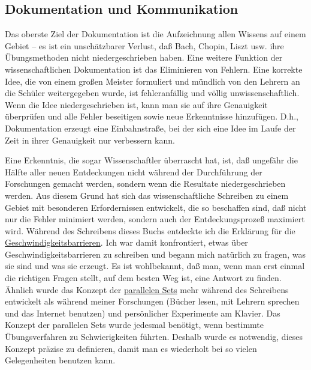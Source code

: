 \subsection{Dokumentation und Kommunikation}
\label{c3_3d}

Das oberste Ziel der Dokumentation ist die Aufzeichnung allen Wissens auf einem Gebiet -- es ist ein unschätzbarer Verlust, daß Bach, Chopin, Liszt usw. ihre Übungsmethoden nicht niedergeschrieben haben.
Eine weitere Funktion der wissenschaftlichen Dokumentation ist das Eliminieren von Fehlern.
Eine korrekte Idee, die von einem großen Meister formuliert und mündlich von den Lehrern an die Schüler weitergegeben wurde, ist fehleranfällig und völlig unwissenschaftlich.
Wenn die Idee niedergeschrieben ist, kann man sie auf ihre Genauigkeit überprüfen und alle Fehler beseitigen sowie neue Erkenntnisse hinzufügen.
D.h., Dokumentation erzeugt eine Einbahnstraße, bei der sich eine Idee im Laufe der Zeit in ihrer Genauigkeit nur verbessern kann.

Eine Erkenntnis, die sogar Wissenschaftler überrascht hat, ist, daß ungefähr die Hälfte aller neuen Entdeckungen nicht während der Durchführung der Forschungen gemacht werden, sondern wenn die Resultate niedergeschrieben werden.
Aus diesem Grund hat sich das wissenschaftliche Schreiben zu einem Gebiet mit besonderen Erfordernissen entwickelt, die so beschaffen sind, daß nicht nur die Fehler minimiert werden, sondern auch der Entdeckungsprozeß maximiert wird.
Während des Schreibens dieses Buchs entdeckte ich die Erklärung für die \hyperref[c1iv2b]{Geschwindigkeitsbarrieren}.
Ich war damit konfrontiert, etwas über Geschwindigkeitsbarrieren zu schreiben und begann mich natürlich zu fragen, was sie sind und was sie erzeugt.
Es ist wohlbekannt, daß man, wenn man erst einmal die richtigen Fragen stellt, auf dem besten Weg ist, eine Antwort zu finden.
Ähnlich wurde das Konzept der \hyperref[c1iii7b]{parallelen Sets} mehr während des Schreibens entwickelt als während meiner Forschungen (Bücher lesen, mit Lehrern sprechen und das Internet benutzen) und persönlicher Experimente am Klavier.
Das Konzept der parallelen Sets wurde jedesmal benötigt, wenn bestimmte Übungsverfahren zu Schwierigkeiten führten.
Deshalb wurde es notwendig, dieses Konzept präzise zu definieren, damit man es wiederholt bei so vielen Gelegenheiten benutzen kann.

